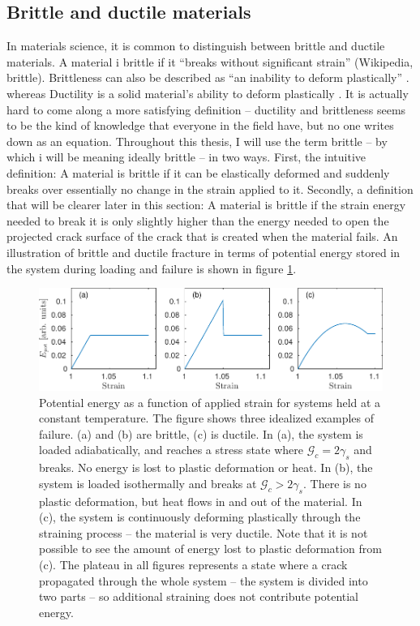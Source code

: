 \subsection{Brittle and ductile materials}
In materials science, it is common to distinguish between brittle and ductile materials. A material i brittle if it ``breaks without significant strain'' (Wikipedia, brittle). Brittleness can also be described as ``an inability to deform plastically'' \cite{benham1996mechanics}. whereas Ductility is a solid material's ability to deform plastically \cite{benham1996mechanics}. It is actually hard to come along a more satisfying definition -- ductility and brittleness seems to be the kind of knowledge that everyone in the field have, but no one writes down as an equation. Throughout this thesis, I will use the term brittle -- by which i will be meaning ideally brittle -- in two ways. First, the intuitive definition: A material is brittle if it can be elastically deformed and suddenly breaks over essentially no change in the strain applied to it. Secondly, a definition that will be clearer later in this section: A material is brittle if the strain energy needed to break it is only slightly higher than the energy needed to open the projected crack surface of the crack that is created when the material fails. An illustration of brittle and ductile fracture in terms of potential energy stored in the system during loading and failure is shown in figure \ref{fig:idealized_fracture}.

\begin{figure}
\centering
\includegraphics[width=\textwidth]{../figures/thesis/idealized_fracture_e_pot.pdf}
\caption{Potential energy as a function of applied strain for systems held at a constant temperature. The figure shows three idealized examples of failure. (a) and (b) are brittle, (c) is ductile. In (a), the system is loaded adiabatically, and reaches a stress state where $\mathcal{G}_c = 2\gamma_s$ and breaks. No energy is lost to plastic deformation or heat. In (b), the system is loaded isothermally and breaks at $\mathcal{G}_c > 2\gamma_s$. There is no plastic deformation, but heat flows in and out of the material. In (c), the system is continuously deforming plastically through the straining process -- the material is very ductile. Note that it is not possible to see the amount of energy lost to plastic deformation from (c). The plateau in all figures represents a state where a crack propagated through the whole system -- the system is divided into two parts -- so additional straining does not contribute potential energy. }
\label{fig:idealized_fracture}
\end{figure}

